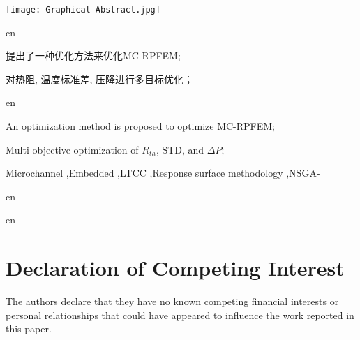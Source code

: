 \documentclass[preprint,5p,sort&compress,times,UTF8]{elsarticle}                                             %
\newcommand{\Nomenclature}{
    \iftagged{cn}
    {}
    {}
    }
\newcommand{\rn}[1]{\uppercase\expandafter{\romannumeral#1}} %
\begin{document}
\begin{frontmatter}
    \begin{graphicalabstract}
        \centering
        \texttt{[image: Graphical-Abstract.jpg]}
    \end{graphicalabstract}

    \begin{highlights}
        \begin{taggedblock}{cn}
            \item 提出了一种优化方法来优化MC-RPFEM;
            \item 对热阻, 温度标准差, 压降进行多目标优化；
        \end{taggedblock}

        \begin{taggedblock}{en}
            \item An optimization method is proposed to optimize MC-RPFEM;
            \item Multi-objective optimization of $R_{th}$, STD, and $\Delta P$;
        \end{taggedblock}
    \end{highlights}
    
    \begin{keyword}
        Microchannel \sep Embedded \sep LTCC \sep Response surface methodology \sep NSGA-\rn{2}
    \end{keyword}
\end{frontmatter}


\begin{taggedblock}{cn}
    
    
    
    
     
\end{taggedblock}

\begin{taggedblock}{en}
    
    
    
    
     
\end{taggedblock}



\section*{Declaration of Competing Interest}
The authors declare that they have no known competing financial interests or personal relationships that could have appeared to influence the work reported in this paper.
\end{document}

